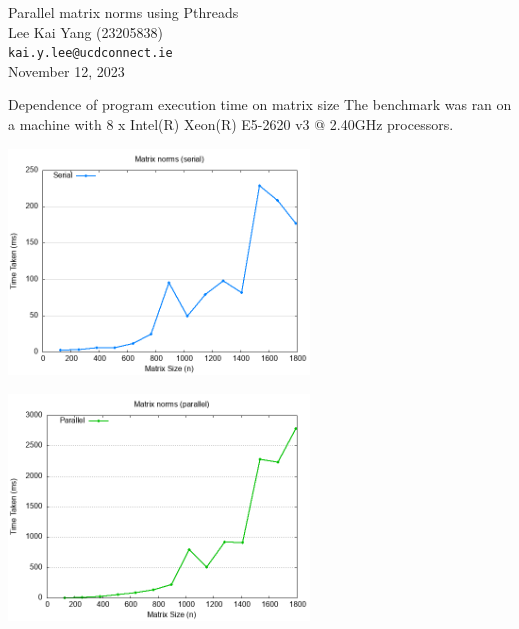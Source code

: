 \documentclass[12pt]{article}
\begin{document}
\begin{center}
    {\LARGE Parallel matrix norms using Pthreads} \\[0.6cm]

    Lee Kai Yang (23205838) \\
    \texttt{\small kai.y.lee@ucdconnect.ie} \\[0.3cm]

    \small November 12, 2023
\end{center}

\begin{section}{Dependence of program execution time on matrix size}
 The benchmark was ran on a machine with 8 x Intel(R) Xeon(R) E5-2620 v3 @ 2.40GHz processors.

 \begin{center}
     \begin{minipage}{0.48\linewidth}
         \includegraphics*[width=8cm]{images/benchmark_serial.png}
     \end{minipage}
     \begin{minipage}{0.48\linewidth}
         \includegraphics*[width=8cm]{images/benchmark_parallel.png}
     \end{minipage}
 \end{center}

\end{section}
\end{document}
